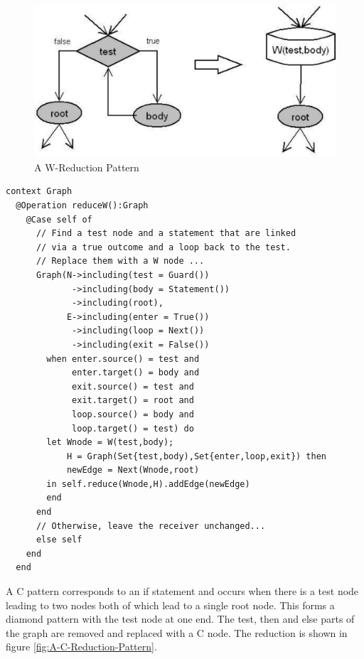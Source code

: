 %
\begin{figure}
\begin{center}

\includegraphics[width=12cm]{LanguageEngineering/Commands/Images/W}

\caption{A W-Reduction Pattern\label{fig:A-W-Reduction-Pattern}}

\end{center}
\end{figure}


\begin{lstlisting}
context Graph
  @Operation reduceW():Graph
    @Case self of
      // Find a test node and a statement that are linked
      // via a true outcome and a loop back to the test.
      // Replace them with a W node ...
      Graph(N->including(test = Guard())
             ->including(body = Statement())
             ->including(root),
            E->including(enter = True())
             ->including(loop = Next())
             ->including(exit = False())
        when enter.source() = test and
             enter.target() = body and
             exit.source() = test and
             exit.target() = root and
             loop.source() = body and
             loop.target() = test) do 
        let Wnode = W(test,body);
            H = Graph(Set{test,body),Set{enter,loop,exit}) then
            newEdge = Next(Wnode,root)
        in self.reduce(Wnode,H).addEdge(newEdge)
        end
      end
      // Otherwise, leave the receiver unchanged...
      else self
    end
  end
\end{lstlisting}A C pattern corresponds to an if statement and occurs when there is
a test node leading to two nodes both of which lead to a single root
node. This forms a diamond pattern with the test node at one end.
The test, then and else parts of the graph are removed and replaced
with a C node. The reduction is shown in figure \ref{fig:A-C-Reduction-Pattern}.

